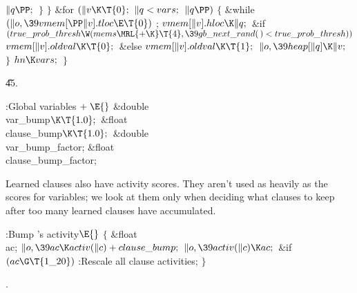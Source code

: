 ${}\|q\PP;{}$\6
\4${}\}{}$\2\6
\4${}\}{}$\2\6
\&{for} ${}(\|v\K\T{0};{}$ ${}\|q<\\{vars};{}$ ${}\|q\PP){}$\5
${}\{{}$\1\6
\&{while} ${}(\|o,\39\\{vmem}[\PP\|v].\\{tloc}\E\T{0}){}$\1\5
;\2\6
${}\\{vmem}[\|v].\\{hloc}\K\|q;{}$\6
\&{if} ${}(\\{true\_prob\_thresh}\W(\\{mems}\MRL{+{\K}}\T{4},\39\\{gb\_next%
\_rand}(\,)<\\{true\_prob\_thresh})){}$\1\5
${}\\{vmem}[\|v].\\{oldval}\K\T{0};{}$\2\6
\&{else}\1\5
${}\\{vmem}[\|v].\\{oldval}\K\T{1};{}$\2\6
${}\|o,\39\\{heap}[\|q]\K\|v;{}$\6
\4${}\}{}$\2\6
${}\\{hn}\K\\{vars};{}$\6
\4${}\}{}$\2\par
\U45.\fi

\B{}:Global variables\X${}\mathrel+\E{}$\6
\&{double} \\{var\_bump}${}\K\T{1.0};{}$\6
\&{float} \\{clause\_bump}${}\K\T{1.0};{}$\6
\&{double} \\{var\_bump\_factor};\6
\&{float} \\{clause\_bump\_factor};\par
\fi

Learned clauses also have activity scores. They aren't used
as
heavily as the scores for variables; we look at them only when
deciding what clauses to keep after too many learned clauses
have accumulated.

\Y\B\4:Bump 's activity\X${}\E{}$\6
${}\{{}$\1\6
\&{float} \\{ac};\7
${}\|o,\39\\{ac}\K\\{activ}(\|c)+\\{clause\_bump};{}$\6
${}\|o,\39\\{activ}(\|c)\K\\{ac};{}$\6
\&{if} ${}(\\{ac}\G\T{1\_20}){}$\1\5
:Rescale all clause activities\X;\2\6
\4${}\}{}$\2\par
{}.\fi

